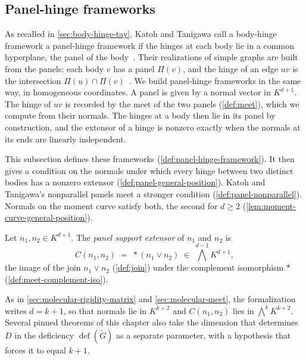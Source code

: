 \subsection{Panel-hinge frameworks}
\label{sec:molecular-algebraic-induction-panel}

As recalled in \cref{sec:body-hinge-tay}, Katoh and Tanigawa call a
body-hinge framework a panel-hinge framework if the hinges at each body
lie in a common hyperplane, the panel of the
body~\cite[p.~648]{katohTanigawa2011}. Their realizations of simple
graphs are built from the panels: each body $v$ has a panel $\Pi(v)$,
and the hinge of an edge $uv$ is the intersection
$\Pi(u) \cap \Pi(v)$~\cite[\S5.1]{katohTanigawa2011}. We build
panel-hinge frameworks in the same way, in homogeneous coordinates. A
panel is given by a normal vector in $K^{d+1}$. The hinge of $uv$ is
recorded by the meet of the two panels (\cref{def:meet}), which we
compute from their normals. The hinges at a body then lie in its panel by
construction, and the extensor of a hinge is nonzero exactly when the
normals at its ends are linearly independent.

This subsection defines these frameworks
(\cref{def:panel-hinge-framework}). It then gives a condition on the
normals under which every hinge between two distinct bodies has a nonzero
extensor (\cref{def:panel-general-position}). Katoh and Tanigawa's
nonparallel panels meet a stronger condition
(\cref{def:panel-nonparallel}). Normals on the moment curve satisfy both,
the second for $d \ge 2$ (\cref{lem:moment-curve-general-position}).

\begin{definition}
  \label{def:panel-support-extensor}
  \leanok
  Let $n_1, n_2 \in K^{d+1}$. The \emph{panel support extensor} of $n_1$
  and $n_2$ is
  \[
    C(n_1, n_2) \;=\; *(n_1 \vee n_2)
    \;\in\; \textstyle\bigwedge^{d-1} K^{d+1},
  \]
  the image of the join $n_1 \vee n_2$ (\cref{def:join}) under the
  complement isomorphism $*$ (\cref{def:meet-complement-iso}).
\end{definition}

\begin{fmlnote}
  As in \cref{sec:molecular-rigidity-matrix} and \cref{sec:molecular-meet},
  the formalization writes $d = k + 1$, so that normals lie in $K^{k+2}$
  and $C(n_1, n_2)$ lies in $\bigwedge^{k} K^{k+2}$. Several pinned
  theorems of this chapter also take the dimension that determines $D$ in
  the deficiency $\operatorname{def}(\tilde G)$ as a separate parameter,
  with a hypothesis that forces it to equal $k + 1$.
\end{fmlnote}


